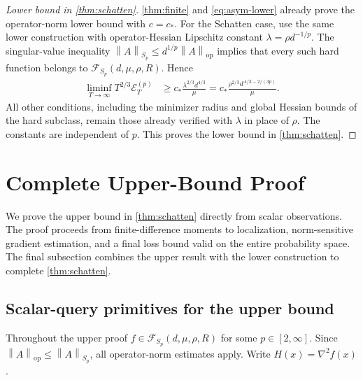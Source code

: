 \documentclass[11pt,a4paper]{article}
\newcommand{\FS}{\mathcal F_{S_p}}
\newcommand{\ES}{\mathcal E_T^{(p)}}
\newcommand{\norm}[1]{\left\lVert#1\right\rVert}
\newcommand{\op}{\mathrm{op}}
\theoremstyle{definition}
\theoremstyle{remark}
\begin{document}
\begin{proof}[Lower bound in \cref{thm:schatten}]
\cref{thm:finite} and \eqref{eq:asym-lower} already prove the operator-norm lower bound with $c=c_*$. For the Schatten case, use the same lower construction with operator-Hessian Lipschitz constant
$\lambda=\rho d^{-1/p}$. The singular-value inequality
$\norm A_{S_p}\le d^{1/p}\norm A_{\op}$ implies that every such hard function belongs to $\FS(d,\mu,\rho,R)$. Hence
\begin{align*}
 \liminf_{T\to\infty}T^{2/3}\ES
 &\ge c_*\frac{\lambda^{2/3}d^{4/3}}\mu
 =c_*\frac{\rho^{2/3}d^{\,4/3-2/(3p)}}\mu.
\end{align*}
All other conditions, including the minimizer radius and global Hessian bounds of the hard subclass, remain those already verified with $\lambda$ in place of $\rho$. The constants are independent of $p$. This proves the lower bound in \cref{thm:schatten}.
\end{proof}

\section{Complete Upper-Bound Proof}
\label{app:upper}
We prove the upper bound in \cref{thm:schatten} directly from scalar observations. The proof proceeds from finite-difference moments to localization, norm-sensitive gradient estimation, and a final loss bound valid on the entire probability space. The final subsection combines the upper result with the lower construction to complete \cref{thm:schatten}.

\subsection{Scalar-query primitives for the upper bound}
\label{sec:primitives}
Throughout the upper proof $f\in\FS(d,\mu,\rho,R)$ for some $p\in[2,\infty]$. Since $\norm{A}_{\op}\le\norm{A}_{S_p}$, all operator-norm estimates apply. Write $H(x)=\nabla^2 f(x)$.
\end{document}
